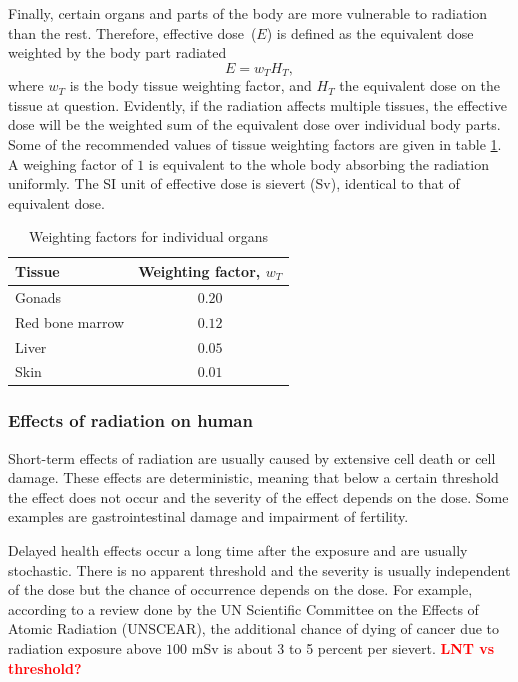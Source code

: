 \documentclass[preprint,aip,pra]{revtex4-1}
\newcommand{\red}[1]{\textcolor{red}{\bf #1}}
\begin{document}
        Finally, certain organs and parts of the body are more vulnerable to radiation than the rest.
        Therefore, effective dose~($E$) is defined as the equivalent dose weighted by the body part
        radiated
        \begin{equation}
            E = w_T H_T,
        \end{equation}
        where $w_T$ is the body tissue weighting factor, and $H_T$ the equivalent dose on the tissue
        at question.
        Evidently, if the radiation affects multiple tissues, the effective dose will be the weighted
        sum of the equivalent dose over individual body parts. Some of the recommended values of tissue
        weighting factors are given in table \ref{tab:eff}. A weighing factor of $1$ is equivalent to the
        whole body absorbing the radiation uniformly. The SI unit of effective dose is sievert (Sv),
        identical to that of equivalent dose.
        \begin{table}
            \label{tab:eff}
            \centering
            \caption{Weighting factors for individual organs\cite{icrp74}}
            \begin{ruledtabular}
                \begin{tabular}{l c}
                Tissue & Weighting factor, $w_T$\\
                \hline
                Gonads & $0.20$\\
                Red bone marrow & $0.12$ \\
                Liver & $0.05$ \\
                Skin & $0.01$ \\
                \end{tabular}
            \end{ruledtabular}
        \end{table}
        \subsubsection{Effects of radiation on human}
        Short-term effects of radiation are usually caused by extensive cell death or cell damage.\cite{u16}
        These effects are deterministic, meaning that below a certain threshold the effect does not occur and
        the severity of the effect depends on the dose. Some examples are gastrointestinal damage and impairment
        of fertility.\cite{u16, l01}

        Delayed health effects occur a long time after the exposure and are usually stochastic. There is
        no apparent threshold and the severity is usually independent of the dose but
        the chance of occurrence depends on the dose.\cite{u16,l01}
        For example, according to a review done by the UN Scientific Committee on the Effects of Atomic Radiation
        (UNSCEAR), the additional chance of dying of cancer due to radiation exposure above $100$ mSv is
        about 3 to 5 percent per sievert.\cite{unscear12}
        \red{LNT vs threshold?}
\end{document}
